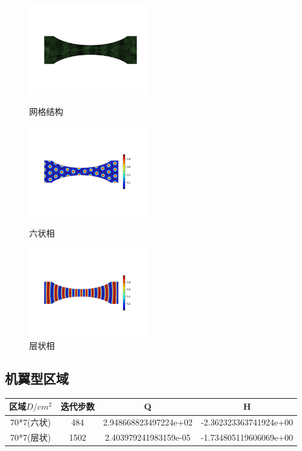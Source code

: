 \documentclass[12pt]{article}
\begin{document}
\begin{CJK}{UTF8}{gkai}
\begin{figure}[H]
	\setlength{\abovecaptionskip}{0.cm}
	\setlength{\belowcaptionskip}{-0.cm}
	\begin{minipage}[!htbp]{0.3\linewidth}
		\includegraphics[width=5.2cm]{Figure_ao.png}
		\caption*{网格结构}
	\end{minipage}
	\hspace{0.23in}
	\begin{minipage}[!htbp]{0.3\linewidth}
		\includegraphics[width=5.2cm]{scftfigure770.png}
		\caption*{六状相}
	\end{minipage}
	\hspace{0.23in}
	\begin{minipage}[!htbp]{0.3\linewidth}
		\includegraphics[width=5.2cm]{scftfigure1162.png}
		\caption*{层状相}
	\end{minipage}
\end{figure} 
\subsection{机翼型区域}   
\begin{table}[H]
	\centering
	\begin{tabular}{cccc}
		\toprule
		区域$D/cm^2$ &	迭代步数 & Q &  H \\
		\midrule
		70*7(六状)&484 &2.948668823497224e+02 & -2.362323363741924e+00\\
		70*7(层状)&1502& 2.403979241983159e-05 & -1.734805119606069e+00\\
		\bottomrule
	\end{tabular}
\end{table}


\end{CJK}
\end{document}
